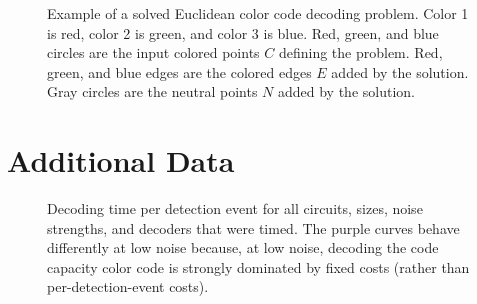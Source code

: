 \documentclass[onecolumn,unpublished,a4paper]{quantumarticle}
\theoremstyle{definition}
\theoremstyle{definition}
\theoremstyle{definition}
\begin{document}
\begin{figure}[H]
    \centering
    \caption{
        Example of a solved Euclidean color code decoding problem.
        Color 1 is red, color 2 is green, and color 3 is blue.
        Red, green, and blue circles are the input colored points $C$ defining the problem.
        Red, green, and blue edges are the colored edges $E$ added by the solution.
        Gray circles are the neutral points $N$ added by the solution.
    }
    \label{fig:euclidean_decoding}
\end{figure}



\clearpage
\section{Additional Data}
\label{app:extra-data}

\begin{figure}[H]
    \centering
    \caption{
        Decoding time per detection event for all circuits, sizes, noise strengths, and decoders that were timed.
        The purple curves behave differently at low noise because, at low noise, decoding the code capacity color code is strongly dominated by fixed costs (rather than per-detection-event costs).
    }
    \label{fig:timing_d_full}
\end{figure}
\end{document}

